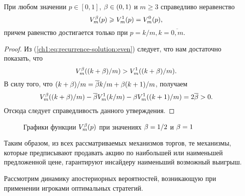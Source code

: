 {\begin{proposition}
  \label{ch1:prop:value-comparison}
  При любом значении $p \in [0,1]$, $\beta \in (0,1)$ и $m \geq 3$ справедливо
  неравенство
  \begin{equation*}
    V^{\beta}_m(p) \geqslant V^1_m(p) = V^0_m(p),
  \end{equation*}
  причем равенство достигается только при $p = k/m, k = \overline{0,m}$.
\end{proposition}
\begin{proof}
  Из (\ref{ch1:eq:recurrence-solution:even}) следует, что нам достаточно
  показать, что 
  \[
    V^\beta_m((k+\beta)/m) > V^1_m((k+\beta)/m).
  \]
  В силу того, что $(k+\beta)/m = {\overline{\beta}} k/m + \beta (k+1)/m$, получаем
  \begin{gather*}
    V^{\beta}_m((k+\beta)/m) - {\overline{\beta}} V^1_m(k/m) - \beta V^1_m((k+1)/m) = 2{\overline{\beta}} > 0.
  \end{gather*}
  Отсюда следует справедливость данного утверждения.
\end{proof}

\begin{figure}[b]
  \centering
  \caption{Графики функции $V^{\beta}_m(p)$ при значениях $\beta = 1/2$ и $\beta = 1$}
  \label{ch1:fig:value-comparison}
\end{figure}

Таким образом, из всех рассматриваемых механизмов торгов, те механизмы, которые
предписывают продавать акцию по наибольшей или наименьшей предложенной цене,
гарантируют инсайдеру наименьший возможный выигрыш.

Рассмотрим динамику апостериорных вероятностей, возникающую при применении
игроками оптимальных стратегий.

}
